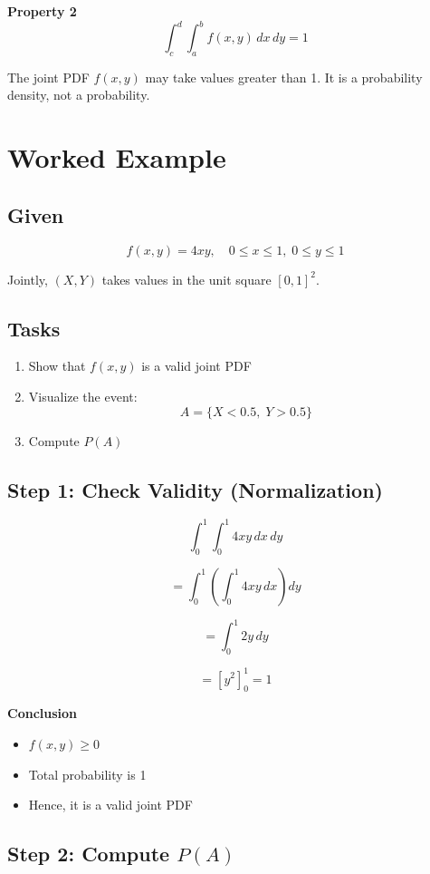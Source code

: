 \documentclass[12pt]{article}
\begin{document}
\textbf{Property 2}
\[
\int_c^d \int_a^b f(x,y)\, dx\, dy = 1
\]

The joint PDF $f(x,y)$ may take values greater than 1. It is a probability density, not a probability.

\section{Worked Example}

\subsection{Given}

\[
f(x,y) = 4xy, \quad 0 \le x \le 1, \; 0 \le y \le 1
\]

Jointly, $(X,Y)$ takes values in the unit square $[0,1]^2$.

\subsection{Tasks}

\begin{enumerate}
\item Show that $f(x,y)$ is a valid joint PDF
\item Visualize the event:
\[
A = \{X < 0.5, \; Y > 0.5\}
\]
\item Compute $P(A)$
\end{enumerate}

\subsection{Step 1: Check Validity (Normalization)}

\[
\int_0^1 \int_0^1 4xy\, dx\, dy
\]

\[
= \int_0^1 \left(\int_0^1 4xy\, dx\right) dy
\]

\[
= \int_0^1 2y\, dy
\]

\[
= [y^2]_0^1 = 1
\]

\textbf{Conclusion}

\begin{itemize}
\item $f(x,y) \ge 0$
\item Total probability is 1
\item Hence, it is a valid joint PDF
\end{itemize}

\subsection{Step 2: Compute $P(A)$}
\end{document}
